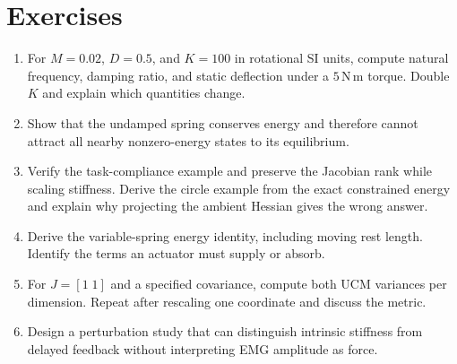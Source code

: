 \section*{Exercises}
\begin{enumerate}
\item For $M=0.02$, $D=0.5$, and $K=100$ in rotational SI units,
compute natural frequency, damping ratio, and static deflection under a
$5\,\mathrm{N\,m}$ torque. Double $K$ and explain which quantities change.
\item Show that the undamped spring conserves energy and therefore cannot
attract all nearby nonzero-energy states to its equilibrium.
\item Verify the task-compliance example and preserve the Jacobian rank while
scaling stiffness. Derive the circle example from the exact constrained
energy and explain why projecting the ambient Hessian gives the wrong answer.
\item Derive the variable-spring energy identity, including moving rest length.
Identify the terms an actuator must supply or absorb.
\item For $J=[1\;1]$ and a specified covariance, compute both UCM variances
per dimension. Repeat after rescaling one coordinate and discuss the metric.
\item Design a perturbation study that can distinguish intrinsic stiffness
from delayed feedback without interpreting EMG amplitude as force.
\end{enumerate}
